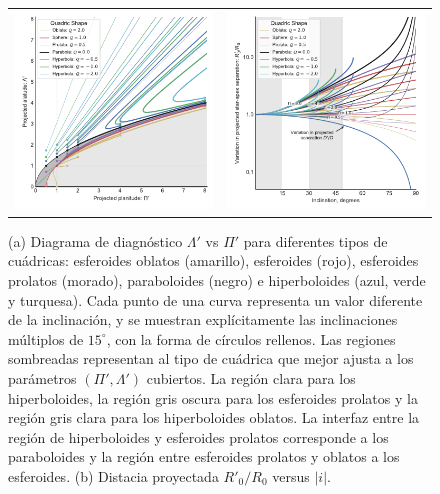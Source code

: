 \begin{figure}
  \begin{tabular}{lr}
    \includegraphics[width=0.5\linewidth]{./Figures/projected-R90-vs-Rc} &
    \includegraphics[width=0.5\linewidth]{./Figures/projected-R0-vs-i}
  \end{tabular}
  \caption{(a) Diagrama de diagnóstico $\Lambda'$ vs $\Pi'$ para diferentes tipos de cuádricas: esferoides oblatos (amarillo), esferoides (rojo), esferoides prolatos (morado), paraboloides (negro) e hiperboloides (azul, verde y turquesa). Cada punto de una curva representa un valor diferente de la inclinación, y se muestran explícitamente las inclinaciones múltiplos de $15^\circ$, con la forma de círculos rellenos. Las regiones sombreadas representan al tipo de cuádrica que mejor ajusta a los parámetros $(\Pi', \Lambda')$ cubiertos. La región clara para los hiperboloides, la región gris oscura para los esferoides prolatos y la región gris clara para los hiperboloides oblatos. La interfaz entre la región de hiperboloides y esferoides prolatos corresponde a los paraboloides y la región entre esferoides prolatos y oblatos a los esferoides. (b) Distacia proyectada $R'_0/R_0$ versus $|i|$.}
  \label{fig:Pip-Lambdap-diagnostic}
\end{figure}

